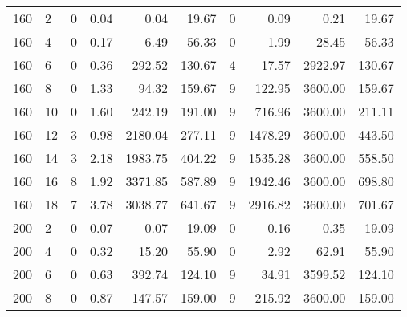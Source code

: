 \begin{appendices}
\begin{table*}[h]
\begin{center}
\begin{tabular} {l l | r r r r | r r r r}
160 & 2                                 &   0             & 0.04          &  0.04       &  19.67       &  0            &  0.09    &  0.21       &  19.67            \\ 
160 & 4                                 &   0             & 0.17          &  6.49       &  56.33       &  0            &  1.99    &  28.45      &  56.33            \\ 
160 & 6                                 &   0             & 0.36          &  292.52     &  130.67      &  4            &  17.57   &  2922.97    &  130.67           \\ 
160 & 8                                 &   0             & 1.33          &  94.32      &  159.67      &  9            &  122.95  &  3600.00    &  159.67           \\ 
160 & 10                                &   0             & 1.60          &  242.19     &  191.00      &  9            &  716.96  &  3600.00    &  211.11           \\ 
160 & 12                                &   3             & 0.98          &  2180.04    &  277.11      &  9            &  1478.29 &  3600.00    &  443.50           \\ 
160 & 14                                &   3             & 2.18          &  1983.75    &  404.22      &  9            &  1535.28 &  3600.00    &  558.50           \\ 
160 & 16                                &   8             & 1.92          &  3371.85    &  587.89      &  9            &  1942.46 &  3600.00    &  698.80           \\ 
160 & 18                                &   7             & 3.78          &  3038.77    &  641.67      &  9            &  2916.82 &  3600.00    &  701.67           \\ 
200 & 2                                 &   0             & 0.07          &  0.07       &  19.09       &  0            &  0.16    &  0.35       &  19.09            \\ 
200 & 4                                 &   0             & 0.32          &  15.20      &  55.90       &  0            &  2.92    &  62.91      &  55.90            \\ 
200 & 6                                 &   0             & 0.63          &  392.74     &  124.10      &  9            &  34.91   &  3599.52    &  124.10           \\ 
200 & 8                                 &   0             & 0.87          &  147.57     &  159.00      &  9            &  215.92  &  3600.00    &  159.00           \\ 

\end{tabular}
\end{center}
\end{table*}
\end{appendices}
